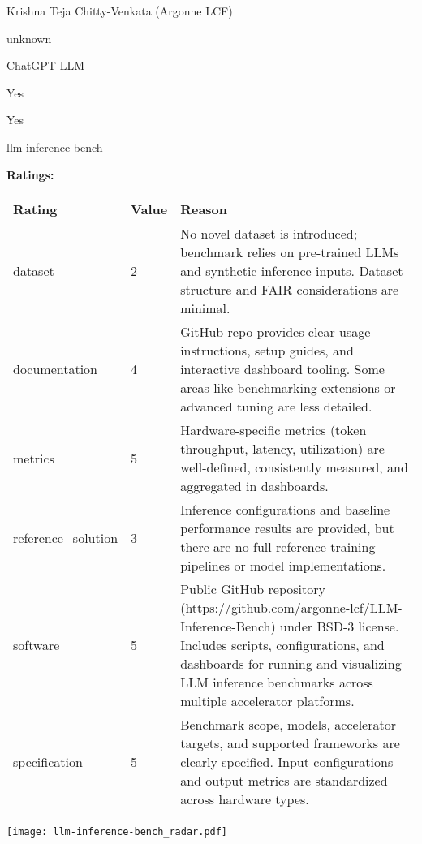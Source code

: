 {{\begin{description}[labelwidth=4cm, labelsep=1em, leftmargin=4cm, itemsep=0.1em, parsep=0em]
  \item[contact.name:] Krishna Teja Chitty-Venkata (Argonne LCF)
  \item[contact.email:] unknown
  \item[results.links.name:] ChatGPT LLM
  \item[fair.reproducible:] Yes
  \item[fair.benchmark\_ready:] Yes
  \item[id:] llm-inference-bench
  \item[Citations:] \cite{10820566}
\end{description}

{\bf Ratings:} ~ \\

\begin{tabular}{p{} p{} p{}}
\hline
Rating & Value & Reason \\
\hline
dataset & 2 & No novel dataset is introduced; benchmark relies on pre-trained LLMs and synthetic inference inputs.
Dataset structure and FAIR considerations are minimal.
 \\
documentation & 4 & GitHub repo provides clear usage instructions, setup guides, and interactive dashboard tooling.
Some areas like benchmarking extensions or advanced tuning are less detailed.
 \\
metrics & 5 & Hardware-specific metrics (token throughput, latency, utilization) are well-defined, consistently measured,
and aggregated in dashboards.
 \\
reference\_solution & 3 & Inference configurations and baseline performance results are provided, but there are no
full reference training pipelines or model implementations.
 \\
software & 5 & Public GitHub repository (https://github.com/argonne-lcf/LLM-Inference-Bench) under BSD-3 license.
Includes scripts, configurations, and dashboards for running and visualizing LLM inference benchmarks
across multiple accelerator platforms.
 \\
specification & 5 & Benchmark scope, models, accelerator targets, and supported frameworks are clearly specified.
Input configurations and output metrics are standardized across hardware types.
 \\
\hline
\end{tabular}

\texttt{[image: llm-inference-bench\_radar.pdf]}
}}
\clearpage